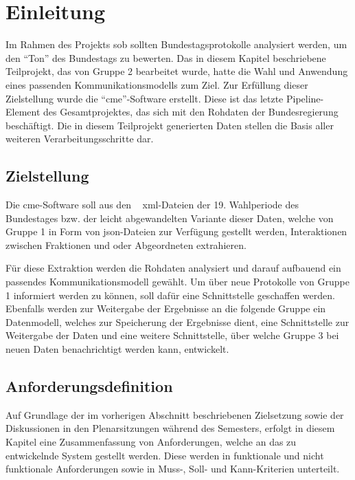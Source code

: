 \section{Einleitung}
\label{sec:03_01_einleitung}

Im Rahmen des Projekts \gls{sob} sollten Bundestagsprotokolle analysiert
werden, um den \enquote{Ton} des Bundestags zu bewerten. Das in diesem
Kapitel beschriebene Teilprojekt, das von Gruppe 2 bearbeitet wurde, hatte
die Wahl und Anwendung eines passenden Kommunikationsmodells zum Ziel. Zur
Erfüllung dieser Zielstellung wurde die \enquote{\gls{cme}}-Software erstellt.
Diese ist das letzte Pipeline-Element des Gesamtprojektes, das sich mit den Rohdaten der
Bundesregierung beschäftigt. Die in diesem Teilprojekt generierten Daten
stellen die Basis aller weiteren Verarbeitungsschritte dar.

\subsection{Zielstellung}
Die \gls{cme}-Software soll aus den ~\cite{OpenData2019}
\gls{xml}-Dateien der 19. Wahlperiode des Bundestages bzw. der leicht
abgewandelten Variante dieser Daten, welche von Gruppe 1 in Form von
\gls{json}-Dateien zur Verfügung gestellt werden, Interaktionen zwischen
Fraktionen und oder Abgeordneten extrahieren.

Für diese Extraktion werden die Rohdaten analysiert und darauf aufbauend ein
passendes Kommunikationsmodell gewählt. Um über neue Protokolle von Gruppe 1
informiert werden zu können, soll dafür eine Schnittstelle geschaffen werden.
Ebenfalls werden zur Weitergabe der Ergebnisse an die folgende Gruppe ein
Datenmodell, welches zur Speicherung der Ergebnisse dient, eine Schnittstelle
zur Weitergabe der Daten und eine weitere Schnittstelle, über welche Gruppe 3
bei neuen Daten benachrichtigt werden kann, entwickelt.

\subsection{Anforderungsdefinition}

Auf Grundlage der im vorherigen Abschnitt beschriebenen Zielsetzung sowie der
Diskussionen in den Plenarsitzungen während des Semesters, erfolgt in diesem
Kapitel eine Zusammenfassung von Anforderungen, welche an das zu entwickelnde
System gestellt werden. Diese werden in funktionale und nicht funktionale
Anforderungen sowie in Muss-, Soll- und Kann-Kriterien unterteilt.

